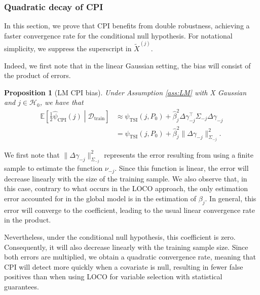 \documentclass{article}
\theoremstyle{plain}
\newtheorem{proposition}[theorem]{Proposition}
\theoremstyle{definition}
\theoremstyle{remark}
\newcommand{\e}[1]{\mathbb{E}\left[#1\right]  } %
\begin{document}
\subsubsection{Quadratic decay of CPI}

In this section, we prove that CPI benefits from double robustness, achieving a faster convergence rate for the conditional null hypothesis. 
For notational simplicity, we suppress the superscript in $\widetilde{X}^{(j)}$.

Indeed, we first note that in the linear Gaussian setting, the bias will consist of the product of errors.

\begin{proposition}[LM CPI bias] Under Assumption \ref{ass:LM} with X Gaussian and $j\in\mathcal{H}_0$, we have that 
\begin{align}
    \e{\frac{1}{2}\widehat{\psi}_\mathrm{CPI}(j)\middle| \mathcal{D}_\mathrm{train}}&\approx \psi_\mathrm{TSI}(j, P_0)+\widehat{\beta}_j^2 \Delta \gamma_{-j}^\top\Sigma_{-j}\Delta\gamma_{-j}\\
    &= \psi_\mathrm{TSI}(j, P_0)+\widehat{\beta}_j^2 \|\Delta \gamma_{-j}\|^2_{\Sigma_{-j}}.
\end{align}
    \label{prop:LM-CPI-bias}
\end{proposition}
 
We first note that $\|\Delta \gamma_{-j}\|^2_{\Sigma_{-j}}$ represents the error resulting from using a finite sample to estimate the function $\nu_{-j}$. Since this function is linear, the error will decrease linearly with the size of the training sample. We also observe that, in this case, contrary to what occurs in the LOCO approach, the only estimation error accounted for in the global model is in the estimation of $\beta_j$. In general, this error will converge to the coefficient, leading to the usual linear convergence rate in the product.

Nevertheless, under the conditional null hypothesis, this coefficient is zero. Consequently, it will also decrease linearly with the training sample size. Since both errors are multiplied, we obtain a quadratic convergence rate, meaning that CPI will detect more quickly when a covariate is null, resulting in fewer false positives than when using LOCO for variable selection with statistical guarantees.
\end{document}
